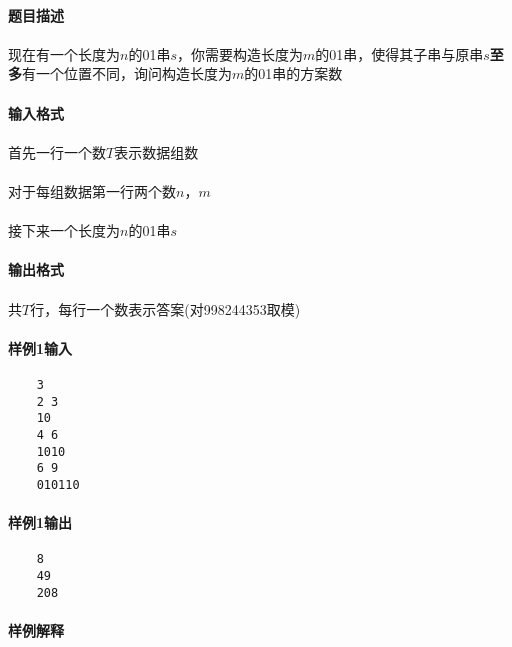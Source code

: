 \documentclass[UTF8]{ctexart}
\begin{document}
\paragraph{题目描述}
\paragraph{}现在有一个长度为$n$的01串$s$，你需要构造长度为$m$的01串，使得其子串与原串$s$\textbf{至多}有一个位置不同，询问构造长度为$m$的01串的方案数
\paragraph{输入格式}
\paragraph{}首先一行一个数$T$表示数据组数
\paragraph{}对于每组数据第一行两个数$n$，$m$
\paragraph{}接下来一个长度为$n$的01串$s$
\paragraph{输出格式}
\paragraph{}共$T$行，每行一个数表示答案(对998244353取模)
\paragraph{样例1输入}
\begin{lstlisting}
    3
    2 3
    10
    4 6
    1010
    6 9
    010110
\end{lstlisting}
\paragraph{样例1输出}
\begin{lstlisting}
    8
    49
    208
\end{lstlisting}
\paragraph{}
\paragraph{样例解释}
\end{document}
